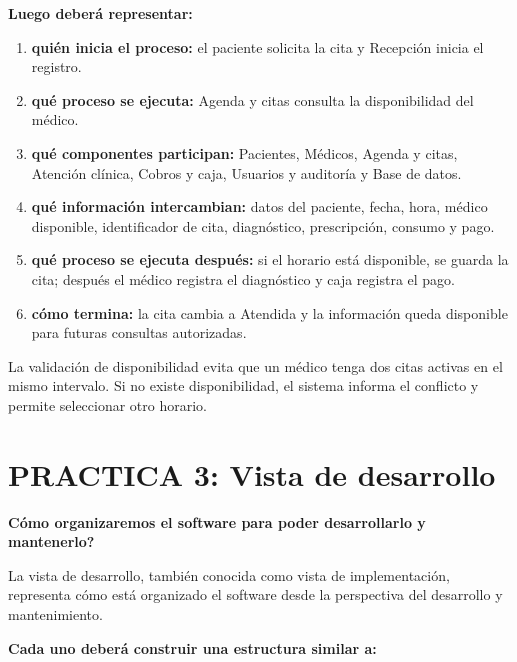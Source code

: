 \colorbox{azulclaro}{\parbox{0.96\linewidth}{\textbf{Luego deberá representar:}}}
\begin{enumerate}
    \item \textbf{quién inicia el proceso:} el paciente solicita la cita y Recepción inicia el registro.
    \item \textbf{qué proceso se ejecuta:} Agenda y citas consulta la disponibilidad del médico.
    \item \textbf{qué componentes participan:} Pacientes, Médicos, Agenda y citas, Atención clínica, Cobros y caja, Usuarios y auditoría y Base de datos.
    \item \textbf{qué información intercambian:} datos del paciente, fecha, hora, médico disponible, identificador de cita, diagnóstico, prescripción, consumo y pago.
    \item \textbf{qué proceso se ejecuta después:} si el horario está disponible, se guarda la cita; después el médico registra el diagnóstico y caja registra el pago.
    \item \textbf{cómo termina:} la cita cambia a Atendida y la información queda disponible para futuras consultas autorizadas.
\end{enumerate}

La validación de disponibilidad evita que un médico tenga dos citas activas en el mismo intervalo. Si no existe disponibilidad, el sistema informa el conflicto y permite seleccionar otro horario.

\section{PRACTICA 3: Vista de desarrollo}

\textbf{\textquestiondown{}Cómo organizaremos el software para poder desarrollarlo y mantenerlo?}

La vista de desarrollo, también conocida como vista de implementación, representa cómo está organizado el software desde la perspectiva del desarrollo y mantenimiento.

\textbf{Cada uno deberá construir una estructura similar a:}

\begin{center}
\\[3pt]
\flechaflujo\\[3pt]
\\[3pt]
\flechaflujo\\[3pt]
\\[3pt]
\flechaflujo\\[3pt]
\end{center}

